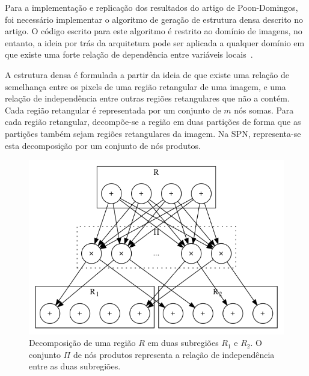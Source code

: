 \documentclass[12pt]{article}
\theoremstyle{plain}
\numberwithin{equation}{section}
\begin{document}
Para a implementação e replicação dos resultados do artigo de Poon-Domingos, foi necessário
implementar o algoritmo de geração de estrutura densa descrito no artigo. O código escrito para
este algoritmo é restrito ao domínio de imagens, no entanto, a ideia por trás da arquitetura pode
ser aplicada a qualquer domínio em que existe uma forte relação de dependência entre variáveis
locais~\cite{poon-domingos}.

A estrutura densa é formulada a partir da ideia de que existe uma relação de semelhança entre
os pixels de uma região retangular de uma imagem, e uma relação de independência entre outras
regiões retangulares que não a contém. Cada região retangular é representada por um conjunto de $m$
nós somas. Para cada região retangular, decompõe-se a região em duas partições de forma que as
partições também sejam regiões retangulares da imagem. Na SPN, representa-se esta decomposição por
um conjunto de nós produtos.

\begin{figure}[h]
  \centering\includegraphics[scale=0.5]{graphs/decomp.png}
  \captionsetup{justification=raggedright}
  \caption{Decomposição de uma região $R$ em duas subregiões $R_1$ e $R_2$. O conjunto $\Pi$ de nós
  produtos representa a relação de independência entre as duas subregiões.}
\end{figure}
\end{document}
